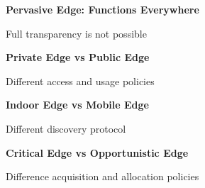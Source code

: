 \textbf{Pervasive Edge: Functions Everywhere}

Full transparency is not possible

\textbf{Private Edge vs Public Edge}

Different access and usage policies

\textbf{Indoor Edge vs Mobile Edge}

Different discovery protocol

\textbf{Critical Edge vs Opportunistic Edge}

Difference acquisition and allocation policies